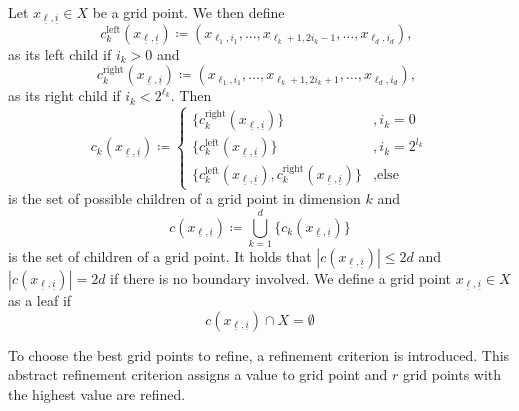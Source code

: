 \documentclass[
  a4paper,  %
  twoside,  %
  bibliography=totoc,
  headsepline,
  cleardoublepage=empty,
  parskip=half,
  draft=false
]{scrbook}
\begin{document}
\begin{definition}
Let $x_{\underline{\ell},\underline{i}} \in X$ be a grid point.
We then define
\begin{equation}
c_{k}^{\text{left}}(x_{\underline{\ell},\underline{i}}) \coloneqq (x_{\ell_1,i_1}, \dots, x_{\ell_k + 1,2  i_k - 1}, \dots, x_{\ell_d,i_d}), ~~ 
\end{equation}
as its left child if $i_k > 0$ and
\begin{equation}
c_{k}^{\text{right}}(x_{\underline{\ell},\underline{i}}) \coloneqq (x_{\ell_1,i_1}, \dots, x_{\ell_k + 1,2  i_k + 1}, \dots, x_{\ell_d,i_d}), ~~ 
\end{equation}
as its right child if $i_k < 2^{\ell_k}$.
Then
\begin{equation}
c_{k}(x_{\underline{\ell},\underline{i}}) \coloneqq
\begin{cases}
\{c_{k}^{\text{right}}(x_{\underline{\ell},\underline{i}})\}&, i_k=0\\
\{c_{k}^{\text{left}}(x_{\underline{\ell},\underline{i}})\}&,i_k= 2^{l_k}\\
\{c_{k}^{\text{left}}(x_{\underline{\ell},\underline{i}}),c_{k}^{\text{right}}(x_{\underline{\ell},\underline{i}}) \}&, \text{else}
\end{cases}
\end{equation}
is the set of possible children of a grid point in dimension $k$ and 
\begin{equation}
c(x_{\underline{\ell},\underline{i}}) \coloneqq \bigcup_{k=1}^d \{c_{k}(x_{\underline{\ell},\underline{i}})\}
\end{equation}
is the set of children of a grid point. It holds that $|c(x_{\underline{\ell},\underline{i}})| \leq 2d$ and $|c(x_{\underline{\ell},\underline{i}})| =2d$ if there is no boundary involved.
We define a grid point $x_{\underline{\ell},\underline{i}} \in X$ as a leaf if
\begin{equation}
c(x_{\underline{\ell},\underline{i}}) \cap X = \emptyset
\end{equation}
\end{definition}

To choose the best grid points to refine, a refinement criterion is introduced.
This abstract refinement criterion assigns a value to grid point and $r$ grid points with the highest value are refined.
\end{document}
